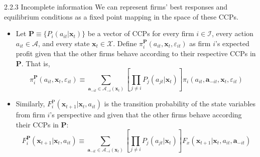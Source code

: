 \documentclass[aspectratio=169]{beamer}  %
\begin{document}
\begin{frame}{2.2.3 Incomplete information}
We can represent firms' best responses and equilibrium conditions as a fixed point mapping in the space of these CCPs.
    \begin{itemize}
        \item  Let \(\mathbf{P} \equiv \{P_i(a_{it}|\mathbf{x}_t)\}\) be a vector of CCPs for every firm \(i \in \mathcal{I}\), every action \(a_{it} \in \mathcal{A}\), and every state \(\mathbf{x}_t \in \mathcal{X}\). Define \(\pi_i^\mathbf{P}(a_{it}, \mathbf{x}_t, \varepsilon_{it})\) as firm \(i\)'s expected profit given that the other firms behave according to their respective CCPs in \(\mathbf{P}\). That is,
        \begin{equation}\label{}
            \pi_i^\mathbf{P}(a_{it}, \mathbf{x}_t, \varepsilon_{it}) \equiv \sum_{\mathbf{a}_{-it} \in \mathcal{A}_{-i}(\mathbf{x}_t)} \left[ \prod_{j \neq i} P_j(a_{jt}|\mathbf{x}_t) \right] \pi_i(a_{it}, \mathbf{a}_{-it}, \mathbf{x}_t, \varepsilon_{it})
        \end{equation}

        \item Similarly, $F_i^\text{P}(\mathbf{x}_{t+1}|\mathbf{x}_t, a_{it})$ is the transition probability of the state variables from firm \(i\)’s perspective and given that the other firms behave according their CCPs in $\mathbf{P}$:
        \begin{equation}
            F_i^\mathbf{P}(\mathbf{x}_{t+1}|\mathbf{x}_t, a_{it}) \equiv \sum_{\mathbf{a}_{-it} \in \mathcal{A}_{-i}(\mathbf{x}_t)} \left[ \prod_{j \neq i} P_j(a_{jt}|\mathbf{x}_t) \right] F_x(\mathbf{x}_{t+1}|\mathbf{x}_t, a_{it}, \mathbf{a}_{-it})
        \end{equation}

    \end{itemize}
\end{frame}
\end{document}
